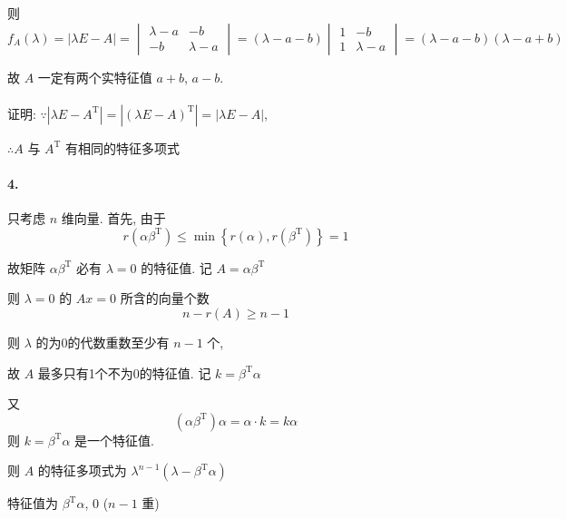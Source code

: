          则 \( f_{A}(\lambda) = |\lambda E - A| = \begin{vmatrix}
             \lambda - a & -b          \\
             -b          & \lambda - a
         \end{vmatrix} = (\lambda - a - b)\begin{vmatrix}
             1 & -b          \\
             1 & \lambda - a
         \end{vmatrix} = (\lambda - a - b)(\lambda - a + b) \)

         故 \( A \) 一定有两个实特征值 \( a+b \), \( a-b \).


     \paragraph{} %
         证明: \( \because |\lambda E - A^{\mathrm{T}}| = |(\lambda E - A)^{\mathrm{T}}| = |\lambda E - A| \),

         \( \therefore A \) 与 \( A^{\mathrm{T}} \) 有相同的特征多项式

     \paragraph{4.} %


         只考虑 \( n \) 维向量. 首先, 由于
         \[ r(\alpha\beta^{\mathrm{T}}) \leq \min\left\{ r(\alpha), r(\beta^{\mathrm{T}}) \right\} = 1 \]

         故矩阵 \( \alpha\beta^{\mathrm{T}} \) 必有 \( \lambda = 0 \) 的特征值. 记 \( A = \alpha\beta^{\mathrm{T}} \)

         则 \( \lambda = 0 \) 的 \( Ax = 0 \) 所含的向量个数
         \[ n - r(A) \geq n - 1 \]

         则 \( \lambda \) 的为0的代数重数至少有 \( n-1 \) 个,

         故 \( A \) 最多只有1个不为0的特征值. 记 \( k = \beta^{\mathrm{T}}\alpha \)

         又 \[
             (\alpha\beta^{\mathrm{T}})\alpha = \alpha\cdot k = k\alpha
         \]
         则 \( k = \beta^{\mathrm{T}}\alpha \) 是一个特征值.

         则 \( A \) 的特征多项式为 \( \lambda^{n-1}(\lambda - \beta^{\mathrm{T}}\alpha) \)

         特征值为 \( \beta^{\mathrm{T}}\alpha \), \( 0 \) (\( n-1 \) 重)

         \setcounter{paragraph}{4} %
